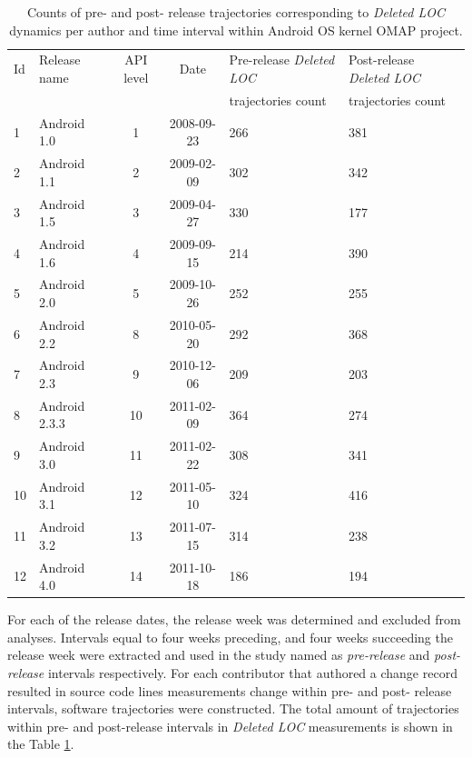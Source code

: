 \begin{table}[t]
\caption{Counts of pre- and post- release trajectories corresponding to \textit{Deleted LOC} dynamics per author and time interval within Android OS kernel OMAP project.}
\label{android_table1}
\centering
\begin{small}
\begin{tabularx}{\linewidth}{l l c c X X}
\toprule
Id &Release name & API level & Date & Pre-release \textit{Deleted LOC} & Post-release \textit{Deleted LOC}\\
& & & & trajectories count & trajectories count\\
\midrule
1 & Android 1.0    & 1 & 2008-09-23    &  266 &    381\\
2 & Android 1.1    & 2 & 2009-02-09     & 302 &    342\\
3 & Android 1.5     & 3 & 2009-04-27    & 330  &   177\\
4 & Android 1.6     & 4 & 2009-09-15    & 214  &   390\\
5 & Android 2.0     & 5 & 2009-10-26    & 252  &   255\\
6 & Android 2.2     & 8 & 2010-05-20    &  292  &   368\\
7 & Android 2.3     & 9  & 2010-12-06    &  209   &  203\\
8 & Android 2.3.3   & 10 & 2011-02-09  &   364  &   274\\
9 & Android 3.0     & 11 & 2011-02-22    &  308   &  341\\
10 & Android 3.1     & 12 & 2011-05-10    &  324 &    416\\
11 & Android 3.2     & 13 & 2011-07-15   &   314 &    238\\
12 & Android 4.0     & 14 & 2011-10-18    &  186  &   194\\
\bottomrule
\end{tabularx}
\end{small}
\end{table}

For each of the release dates, the release week was determined and excluded from analyses. Intervals equal to four weeks preceding, and four weeks succeeding the release week were extracted and used in the study named as \textit{pre-release} and \textit{post-release} intervals respectively. For each contributor that authored a change record resulted in source code lines measurements change within pre- and post- release intervals, software trajectories were constructed. The total amount of trajectories within pre- and post-release intervals in \textit{Deleted LOC} measurements is shown in the Table \ref{android_table1}. 

